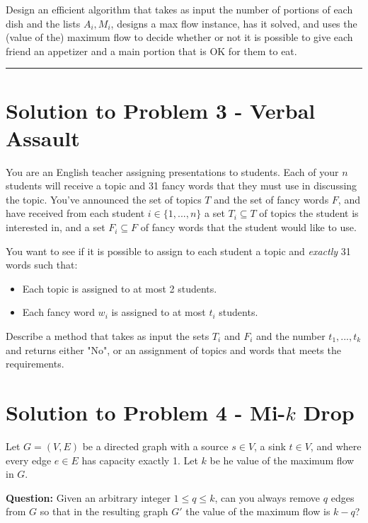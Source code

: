\documentclass[11pt]{article}
\begin{document}
Design an efficient algorithm that takes as input the number of portions of each dish and the lists $A_i, M_i$, designs a max flow instance, has it solved, and uses the (value of the) maximum flow to decide whether or not it is possible to give each friend an appetizer and a main portion that is OK for them to eat.

\noindent\rule{17cm}{0.4pt}

\pagebreak

\section*{Solution to Problem 3 - Verbal Assault}

You are an English teacher assigning presentations to students. Each of your $n$ students will receive a topic and 31 fancy words that they must use in discussing the topic. You've announced the set of topics $T$ and the set of fancy words $F$, and have received from each student $i \in \{1, ..., n\}$ a set $T_i \subseteq T$ of topics the student is interested in, and a set $F_i \subseteq F$ of fancy words that the student would like to use.

You want to see if it is possible to assign to each student a topic and \textit{exactly} 31 words such that:
\begin{itemize}
	\item Each topic is assigned to at most 2 students.
	\item Each fancy word $w_i$ is assigned to at most $t_i$ students.
\end{itemize}

Describe a method that takes as input the sets $T_i$ and $F_i$ and the number $t_1, ..., t_k$ and returns either "No", or an assignment of topics and words that meets the requirements.


\pagebreak

\section*{Solution to Problem 4 - Mi-$k$ Drop}

Let $G = (V,E)$ be a directed graph with a source $s \in V$, a sink $t \in V$, and where every edge $e \in E$ has capacity exactly 1. Let $k$ be he value of the maximum flow in $G$.

\textbf{Question:} Given an arbitrary integer $1 \leq q \leq k$, can you always remove $q$ edges from $G$ so that in the resulting graph $G'$ the value of the maximum flow is $k-q$?
\end{document}
